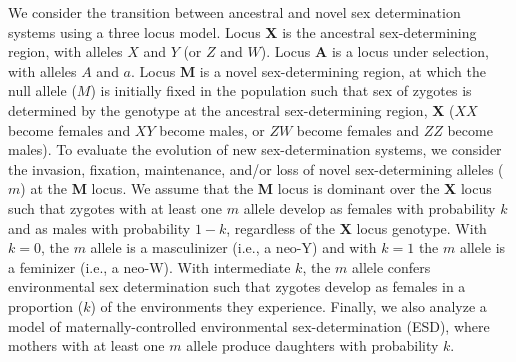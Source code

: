 \documentclass[12pt]{article}
\begin{document}
We consider the transition between ancestral and novel sex determination systems using a three locus model.
Locus \textbf{X} is the ancestral sex-determining region, with alleles $X$ and $Y$ (or $Z$ and $W$).
Locus \textbf{A} is a locus under selection, with alleles $A$ and $a$.
Locus \textbf{M} is a novel sex-determining region, at which the null allele ($M$) is initially fixed in the population such that sex of zygotes is determined by the genotype at the ancestral sex-determining region, \textbf{X} ($XX$ become females and $XY$ become males, or $ZW$ become females and $ZZ$ become males). 
To evaluate the evolution of new sex-determination systems, we consider the invasion, fixation, maintenance, and/or loss of novel sex-determining alleles ($m$) at the \textbf{M} locus. 
We assume that the \textbf{M} locus is dominant over the \textbf{X} locus such that zygotes with at least one $m$ allele develop as females with probability $k$ and as males with probability $1-k$, regardless of the \textbf{X} locus genotype.
With $k=0$, the $m$ allele is a masculinizer (i.e., a neo-Y) and with $k=1$ the $m$ allele is a feminizer (i.e., a neo-W).
With intermediate $k$, the $m$ allele confers environmental sex determination such that zygotes develop as females in a proportion ($k$) of the environments they experience. 
Finally, we also analyze a model of maternally-controlled environmental sex-determination (ESD), where mothers with at least one $m$ allele produce daughters with probability $k$. 
\end{document}
